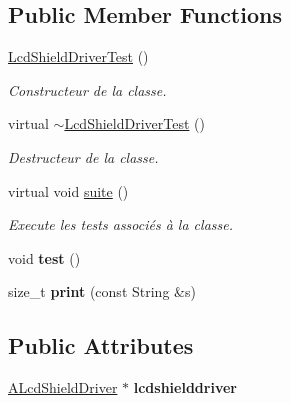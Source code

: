 \subsection*{Public Member Functions}
\begin{DoxyCompactItemize}
\item 
\mbox{\label{classtest_1_1LcdShieldDriverTest_a2d74c92b959ffced2e0e148465af3669}} 
\hyperlink{classtest_1_1LcdShieldDriverTest_a2d74c92b959ffced2e0e148465af3669}{Lcd\+Shield\+Driver\+Test} ()
\begin{DoxyCompactList}\small\item\em Constructeur de la classe. \end{DoxyCompactList}\item 
\mbox{\label{classtest_1_1LcdShieldDriverTest_aed6295363c3d965b81c2ddcce96df51c}} 
virtual \hyperlink{classtest_1_1LcdShieldDriverTest_aed6295363c3d965b81c2ddcce96df51c}{$\sim$\+Lcd\+Shield\+Driver\+Test} ()
\begin{DoxyCompactList}\small\item\em Destructeur de la classe. \end{DoxyCompactList}\item 
\mbox{\label{classtest_1_1LcdShieldDriverTest_a75fae681dded8271b5145d168ce7bdd9}} 
virtual void \hyperlink{classtest_1_1LcdShieldDriverTest_a75fae681dded8271b5145d168ce7bdd9}{suite} ()
\begin{DoxyCompactList}\small\item\em Execute les tests associés à la classe. \end{DoxyCompactList}\item 
\mbox{\label{classtest_1_1LcdShieldDriverTest_a2a7d18c82200f382f483ab89b4f12457}} 
void {\bfseries test} ()
\item 
\mbox{\label{classtest_1_1LcdShieldDriverTest_a0ac83adbb3808ec56daf637388acaf66}} 
size\+\_\+t {\bfseries print} (const String \&s)
\end{DoxyCompactItemize}
\subsection*{Public Attributes}
\begin{DoxyCompactItemize}
\item 
\mbox{\label{classtest_1_1LcdShieldDriverTest_a82f4cf3430f63bc19c06511439ac1f11}} 
\hyperlink{classALcdShieldDriver}{A\+Lcd\+Shield\+Driver} $\ast$ {\bfseries lcdshielddriver}
\end{DoxyCompactItemize}
